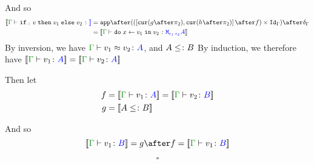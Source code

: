 \documentclass{report}
\begin{document}
And so
\begin{equation}
    \begin{split}
        \deno{\gtyperelation{\pifthenelse{A}{v}{v_1}{v_2}}} & = \ifMorph{f}{g}{h}\\
         & = \deno{\gtyperelation{\doin{x}{v_1}{v_2}}{\M{\e_1\dot\e_2}{A}}}
    \end{split}
\end{equation}
By inversion, we have $\gberelation{v_1}{v_2}{A}$, and $A \leq\colon B$ 
By induction, we therefore have $\deno{\gtyperelation{v_1}{A}} = \deno{\gtyperelation{v_2}{A}}$

Then let
\begin{align*}
    f &{}=\deno{\gtyperelation{v_1}{A}} = \deno{\gtyperelation{v_2}{B}}\\
    g &{}=\deno{A \subtype B}
\end{align*}



And so
\begin{equation}
        \deno{\gtyperelation{v_1}{B}} = g \after f = \deno{\gtyperelation{v_1}{B}}
\end{equation}

$$\square$$
\end{document}
